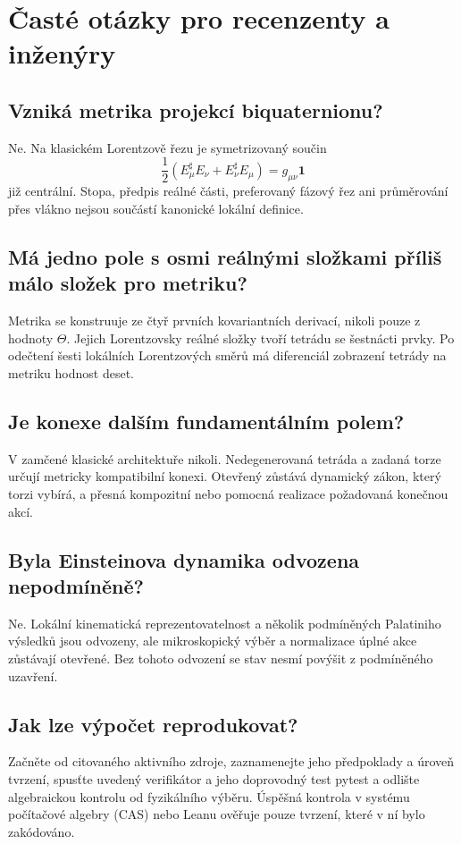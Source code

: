 
\chapter{Časté otázky pro recenzenty a inženýry}

\section{Vzniká metrika projekcí biquaternionu?}
Ne. Na klasickém Lorentzově řezu je symetrizovaný součin
\[
 \frac12(E_\mu^\sharp E_\nu+E_\nu^\sharp E_\mu)
 =g_{\mu\nu}\mathbf1
\]
již centrální. Stopa, předpis reálné části, preferovaný fázový řez ani
průměrování přes vlákno nejsou součástí kanonické lokální definice.

\section{Má jedno pole s osmi reálnými složkami příliš málo složek pro metriku?}
Metrika se konstruuje ze čtyř prvních kovariantních derivací, nikoli pouze
z hodnoty $\Theta$. Jejich Lorentzovsky reálné složky tvoří tetrádu se
šestnácti prvky. Po odečtení šesti lokálních Lorentzových směrů má
diferenciál zobrazení tetrády na metriku hodnost deset.

\section{Je konexe dalším fundamentálním polem?}
V zamčené klasické architektuře nikoli. Nedegenerovaná tetráda a zadaná
torze určují metricky kompatibilní konexi. Otevřený zůstává dynamický zákon,
který torzi vybírá, a přesná kompozitní nebo pomocná realizace požadovaná
konečnou akcí.

\section{Byla Einsteinova dynamika odvozena nepodmíněně?}
Ne. Lokální kinematická reprezentovatelnost a několik podmíněných
Palatiniho výsledků jsou odvozeny, ale mikroskopický výběr a normalizace úplné
akce zůstávají otevřené. Bez tohoto odvození se stav nesmí povýšit z
podmíněného uzavření.

\section{Jak lze výpočet reprodukovat?}
Začněte od citovaného aktivního zdroje, zaznamenejte jeho předpoklady a
úroveň tvrzení, spusťte uvedený verifikátor a jeho doprovodný test pytest a
odlište algebraickou kontrolu od fyzikálního výběru. Úspěšná kontrola v systému
počítačové algebry (CAS) nebo
Leanu ověřuje pouze tvrzení, které v ní bylo zakódováno.
